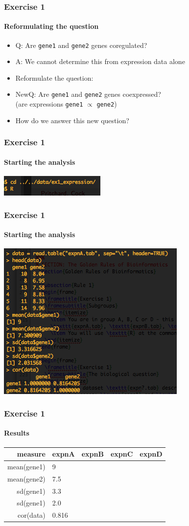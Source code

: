 \documentclass[table]{beamer}
\begin{document}
  \begin{frame}
    \frametitle{Exercise 1}
    \framesubtitle{Reformulating the question}
    \begin{itemize}
      \item Q: Are \texttt{gene1} and \texttt{gene2} genes coregulated?
      \item A: We cannot determine this from expression data alone
      \item Reformulate the question:
      \item NewQ: Are \texttt{gene1} and \texttt{gene2} genes coexpressed? \\
            (are expressions \texttt{gene1} $\propto$ \texttt{gene2})
      \item How do we answer this new question?
    \end{itemize}
  \end{frame}

  \begin{frame}
    \frametitle{Exercise 1}
    \framesubtitle{Starting the analysis}
    \includegraphics[width=.5\textwidth]{images/ex1_screenshot_a}
  \end{frame}

  \begin{frame}
    \frametitle{Exercise 1}
    \framesubtitle{Starting the analysis}
    \includegraphics[width=.5\textwidth]{images/ex1_screenshot_b}
  \end{frame}

  \begin{frame}
    \frametitle{Exercise 1}
    \framesubtitle{Results}
    \begin{center}
	\begin{tabular}{r|l|l|l|l}
	  measure & expnA & expnB & expnC & expnD \\
	  \hline
	  mean(gene1) & 9     &  &  & \\
	  mean(gene2) & 7.5   &  &  & \\
  	  sd(gene1)   & 3.3   &  &  & \\
  	  sd(gene1)   & 2.0   &  &  & \\  
	  cor(data)   & 0.816 &  &  & \\  
	\end{tabular}
    \end{center}
  \end{frame}
\end{document}
